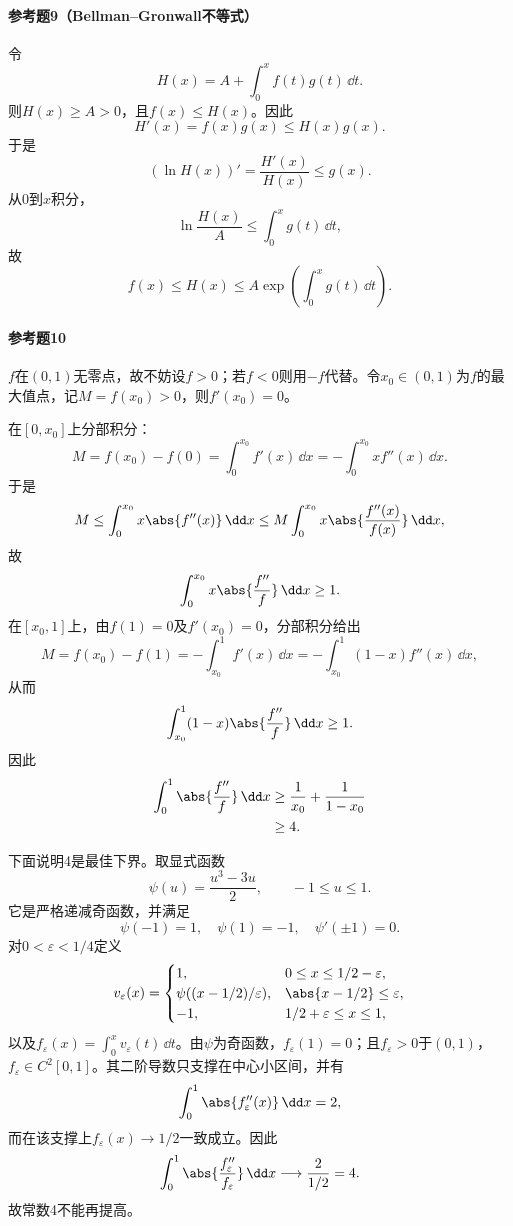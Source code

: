 \paragraph{参考题9（Bellman--Gronwall不等式）}
\begin{xsolution}
令
\[
 H(x)=A+\int_0^xf(t)g(t)\,\dd t.
\]
则$H(x)\ge A>0$，且$f(x)\le H(x)$。因此
\[
 H'(x)=f(x)g(x)\le H(x)g(x).
\]
于是
\[
 (\ln H(x))'=\frac{H'(x)}{H(x)}\le g(x).
\]
从0到$x$积分，
\[
 \ln\frac{H(x)}A\le\int_0^xg(t)\,\dd t,
\]
故
\[
 f(x)\le H(x)\le A\exp\left(\int_0^xg(t)\,\dd t\right).
\]
\end{xsolution}

\paragraph{参考题10}
\begin{xsolution}
$f$在$(0,1)$无零点，故不妨设$f>0$；若$f<0$则用$-f$代替。令$x_0\in(0,1)$为$f$的最大值点，记$M=f(x_0)>0$，则$f'(x_0)=0$。

在$[0,x_0]$上分部积分：
\[
 M=f(x_0)-f(0)=\int_0^{x_0}f'(x)\,\dd x
 =-\int_0^{x_0}x f''(x)\,\dd x.
\]
于是
\[
 M\le\int_0^{x_0}x\abs{f''(x)}\,\dd x
 \le M\int_0^{x_0}x\abs{\frac{f''(x)}{f(x)}}\,\dd x,
\]
故
\[
 \int_0^{x_0}x\abs{\frac{f''}{f}}\,\dd x\ge1.
\]
在$[x_0,1]$上，由$f(1)=0$及$f'(x_0)=0$，分部积分给出
\[
 M=f(x_0)-f(1)=-\int_{x_0}^1f'(x)\,\dd x
 =-\int_{x_0}^1(1-x)f''(x)\,\dd x,
\]
从而
\[
 \int_{x_0}^1(1-x)\abs{\frac{f''}{f}}\,\dd x\ge1.
\]
因此
\begin{align*}
\int_0^1\abs{\frac{f''}{f}}\,\dd x
&\ge\frac1{x_0}+\frac1{1-x_0}\\
&\ge4.
\end{align*}

下面说明4是最佳下界。取显式函数
\[
 \psi(u)=\frac{u^3-3u}{2},\qquad -1\le u\le1.
\]
它是严格递减奇函数，并满足
\[
 \psi(-1)=1,\quad \psi(1)=-1,\quad \psi'(\pm1)=0.
\]
对$0<\varepsilon<1/4$定义
\[
 v_\varepsilon(x)=
 \begin{cases}
 1,&0\le x\le1/2-\varepsilon,\\
 \psi((x-1/2)/\varepsilon),&\abs{x-1/2}\le\varepsilon,\\
 -1,&1/2+\varepsilon\le x\le1,
 \end{cases}
\]
以及$f_\varepsilon(x)=\int_0^xv_\varepsilon(t)\,\dd t$。由$\psi$为奇函数，$f_\varepsilon(1)=0$；且$f_\varepsilon>0$于$(0,1)$，$f_\varepsilon\in C^2[0,1]$。其二阶导数只支撑在中心小区间，并有
\[
 \int_0^1\abs{f_\varepsilon''(x)}\,\dd x=2,
\]
而在该支撑上$f_\varepsilon(x)\to1/2$一致成立。因此
\[
 \int_0^1\abs{\frac{f_\varepsilon''}{f_\varepsilon}}\,\dd x
 \longrightarrow\frac{2}{1/2}=4.
\]
故常数4不能再提高。
\end{xsolution}

